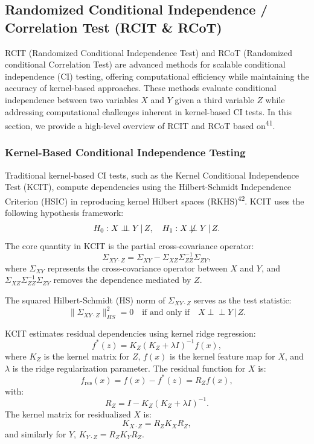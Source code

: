 \documentclass[
]{article}
\begin{document}
\clearpage

\subsection{Randomized Conditional Independence / Correlation Test (RCIT
\& RCoT)}\label{sec-rcot}

RCIT (Randomized Conditional Independence Test) and RCoT (Randomized
conditional Correlation Test) are advanced methods for scalable
conditional independence (CI) testing, offering computational efficiency
while maintaining the accuracy of kernel-based approaches. These methods
evaluate conditional independence between two variables \(X\) and \(Y\)
given a third variable \(Z\) while addressing computational challenges
inherent in kernel-based CI tests. In this section, we provide a
high-level overview of RCIT and RCoT based on\textsuperscript{41}.

\subsubsection{Kernel-Based Conditional Independence
Testing}\label{kernel-based-conditional-independence-testing}

Traditional kernel-based CI tests, such as the Kernel Conditional
Independence Test (KCIT), compute dependencies using the Hilbert-Schmidt
Independence Criterion (HSIC) in reproducing kernel Hilbert spaces
(RKHS)\textsuperscript{42}. KCIT uses the following hypothesis
framework: \[
H_0: X \perp\!\!\!\perp Y \,|\, Z, \quad H_1: X \not\!\perp\!\!\!\perp Y \,|\, Z.
\] The core quantity in KCIT is the partial cross-covariance operator:
\[
\Sigma_{XY \cdot Z} = \Sigma_{XY} - \Sigma_{XZ} \Sigma_{ZZ}^{-1} \Sigma_{ZY},
\] where \(\Sigma_{XY}\) represents the cross-covariance operator
between \(X\) and \(Y\), and
\(\Sigma_{XZ} \Sigma_{ZZ}^{-1} \Sigma_{ZY}\) removes the dependence
mediated by \(Z\).

The squared Hilbert-Schmidt (HS) norm of \(\Sigma_{XY \cdot Z}\) serves
as the test statistic: \[
\|\Sigma_{XY \cdot Z}\|^2_{HS} = 0 \quad \text{if and only if} \quad X \perp\!\!\!\perp Y \,|\, Z.
\]

KCIT estimates residual dependencies using kernel ridge regression: \[
f^*(z) = K_Z (K_Z + \lambda I)^{-1} f(x),
\] where \(K_Z\) is the kernel matrix for \(Z\), \(f(x)\) is the kernel
feature map for \(X\), and \(\lambda\) is the ridge regularization
parameter. The residual function for \(X\) is: \[
f_\text{res}(x) = f(x) - f^*(z) = R_Z f(x),
\] with: \[
R_Z = I - K_Z (K_Z + \lambda I)^{-1}.
\] The kernel matrix for residualized \(X\) is: \[
K_{X \cdot Z} = R_Z K_X R_Z,
\] and similarly for \(Y\), \(K_{Y \cdot Z} = R_Z K_Y R_Z\).
\end{document}
